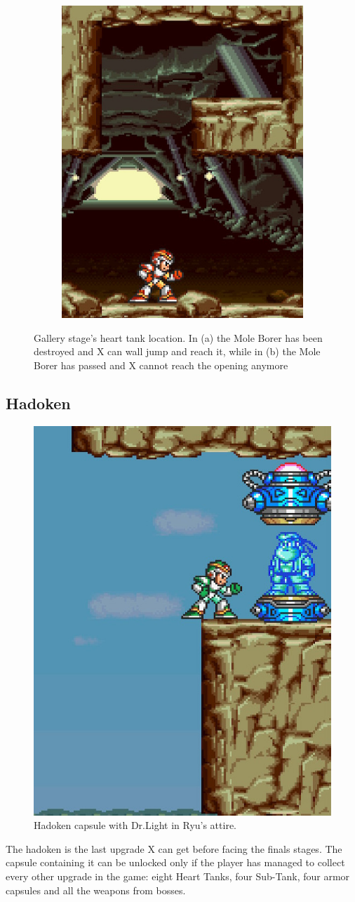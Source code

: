 \begin{figure}[htp]
\begin{subfigure}{0.3\textwidth}
		\includegraphics[width=\linewidth]{figures/X1/Armored_armadillo/Armadillo_heart_2.jpg}
		\caption{}
	\end{subfigure}
	\caption{Gallery stage's heart tank location. In (a) the Mole Borer has been destroyed and X can wall jump and reach it, while in (b) the Mole Borer has passed and X cannot reach the opening anymore}
\end{figure}

\subsection{Hadoken}\label{hadoken}
\begin{figure}[htp]
	\centering
	\includegraphics[width=0.3\linewidth]{figures/X1/Armored_armadillo/Armadillo_hadoken.jpg}
	\caption{Hadoken capsule with Dr.Light in Ryu's attire.}
\end{figure}
The hadoken is the last upgrade X can get before facing the finals stages. The capsule containing it can be unlocked only if the player has managed to collect every other upgrade in the game: eight Heart Tanks, four Sub-Tank, four armor capsules and all the weapons from bosses. 

